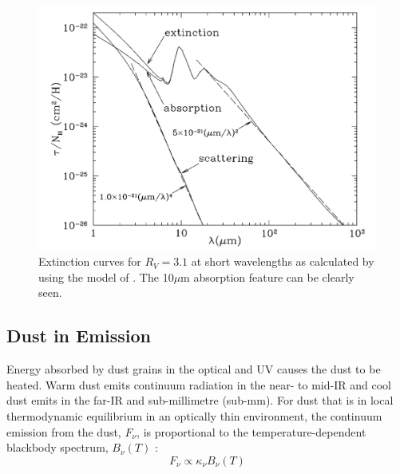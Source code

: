 \begin{figure}
\centering
\includegraphics[clip=true,scale=0.43,trim= 0 0 0 0]{chapters/chapter1/figs/extinction_curve_10um.png}
\caption{Extinction curves for  $R_V=3.1$ at short wavelengths as calculated by  \citet{Draine2003} using the model of \citet{Weingartner2001}.  The 10$\mu$m absorption feature can be clearly seen.}
\label{fig:extinction_curve_10um}
\end{figure}

\subsection{Dust in Emission}
\label{scn:emission}
Energy absorbed by dust grains in the optical and UV causes the dust to be heated.  Warm dust emits continuum radiation in the near- to mid-IR and cool dust emits in the far-IR and sub-millimetre (sub-mm).  For dust that is in local thermodynamic equilibrium in an optically thin environment, the continuum emission from the dust, $F_{\nu}$,  is proportional to the temperature-dependent blackbody spectrum, $B_{\nu}(T)$ \citep{Hildebrand1983}:
\begin{equation}
F_{\nu}\propto \kappa_{\nu} B_{\nu}(T)
\end{equation}

